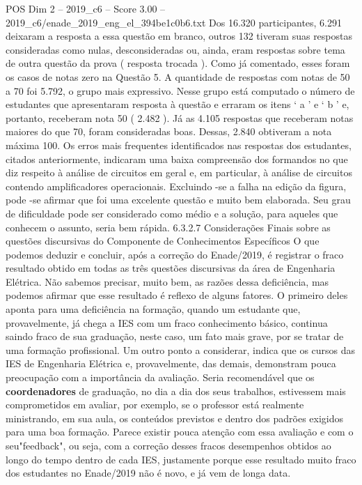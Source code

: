 \begin{textsample}{POS Dim 2 – 2019\_c6 – Score 3.00 – 2019\_c6/enade\_2019\_eng\_el\_394be1c0b6.txt}
Dos 16.320 participantes, 6.291 deixaram a resposta a essa questão em branco, outros 132 tiveram suas respostas consideradas como nulas, desconsideradas ou, ainda, eram respostas sobre tema de outra questão da prova ( resposta trocada ).
Como já comentado, esses foram os casos de notas zero na Questão 5.
A quantidade de respostas com notas de 50 a 70 foi 5.792, o grupo mais expressivo.
Nesse grupo está computado o número de estudantes que apresentaram resposta à questão e erraram os itens ‘ a ’ e ‘ b ’ e, portanto, receberam nota 50 ( 2.482 ).
Já as 4.105 respostas que receberam notas maiores do que 70, foram consideradas boas.
Dessas, 2.840 obtiveram a nota máxima 100.
Os erros mais frequentes identificados nas respostas dos estudantes, citados anteriormente, indicaram uma baixa compreensão dos formandos no que diz respeito à análise de circuitos em geral e, em particular, à análise de circuitos contendo amplificadores operacionais.
Excluindo -se a falha na edição da figura, pode -se afirmar que foi uma excelente questão e muito bem elaborada.
Seu grau de dificuldade pode ser considerado como médio e a solução, para aqueles que conhecem o assunto, seria bem rápida. 6.3.2.7 Considerações Finais sobre as questões discursivas do Componente de Conhecimentos Específicos O que podemos deduzir e concluir, após a correção do Enade/2019, é registrar o fraco resultado obtido em todas as três questões discursivas da área de Engenharia Elétrica.
Não sabemos precisar, muito bem, as razões dessa deficiência, mas podemos afirmar que esse resultado é reflexo de alguns fatores.
O primeiro deles aponta para uma deficiência na formação, quando um estudante que, provavelmente, já chega a IES com um fraco conhecimento básico, continua saindo fraco de sua graduação, neste caso, um fato mais grave, por se tratar de uma formação profissional.
Um outro ponto a considerar, indica que os cursos das IES de Engenharia Elétrica e, provavelmente, das demais, demonstram pouca preocupação com a importância da avaliação.
Seria recomendável que os \textbf{coordenadores} de graduação, no dia a dia dos seus trabalhos, estivessem mais comprometidos em avaliar, por exemplo, se o professor está realmente ministrando, em sua aula, os conteúdos previstos e dentro dos padrões exigidos para uma boa formação.
Parece existir pouca atenção com essa avaliação e com o seu"feedback", ou seja, com a correção desses fracos desempenhos obtidos ao longo do tempo dentro de cada IES, justamente porque esse resultado muito fraco dos estudantes no Enade/2019 não é novo, e já vem de longa data.

\end{textsample}
